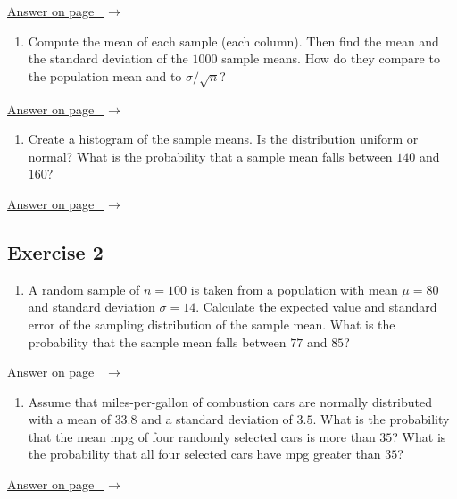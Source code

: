 \documentclass[
  11pt,
  letterpaper,
  DIV=11,
  numbers=noendperiod,
  oneside,
  open=any]{scrreprt}
\providecommand{\tightlist}{%
  \setlength{\itemsep}{0pt}\setlength{\parskip}{0pt}}\usepackage{longtable,booktabs,array}
\newcommand{\bsanswerref}[1]{%
  \par\nopagebreak\hypertarget{q-#1}{}\label{q-#1}%
  {\raggedleft\sffamily\footnotesize\hyperlink{a-#1}{\textcolor{bsaccent}{Answer on page \pageref{a-#1}\ $\rightarrow$}}\par}%
  \medskip}
\begin{document}
\bsanswerref{bsans104}

\begin{enumerate}
\def\labelenumi{\arabic{enumi}.}
\setcounter{enumi}{1}
\tightlist
\item
  Compute the mean of each sample (each column). Then find the mean and
  the standard deviation of the \(1000\) sample means. How do they
  compare to the population mean and to \(\sigma / \sqrt{n}\)?
\end{enumerate}

\bsanswerref{bsans105}

\begin{enumerate}
\def\labelenumi{\arabic{enumi}.}
\setcounter{enumi}{2}
\tightlist
\item
  Create a histogram of the sample means. Is the distribution uniform or
  normal? What is the probability that a sample mean falls between
  \(140\) and \(160\)?
\end{enumerate}

\bsanswerref{bsans106}

\subsection*{Exercise 2}\label{exercise-2-10}

\begin{enumerate}
\def\labelenumi{\arabic{enumi}.}
\tightlist
\item
  A random sample of \(n=100\) is taken from a population with mean
  \(\mu=80\) and standard deviation \(\sigma=14\). Calculate the
  expected value and standard error of the sampling distribution of the
  sample mean. What is the probability that the sample mean falls
  between \(77\) and \(85\)?
\end{enumerate}

\bsanswerref{bsans107}

\begin{enumerate}
\def\labelenumi{\arabic{enumi}.}
\setcounter{enumi}{1}
\tightlist
\item
  Assume that miles-per-gallon of combustion cars are normally
  distributed with a mean of \(33.8\) and a standard deviation of
  \(3.5\). What is the probability that the mean mpg of four randomly
  selected cars is more than \(35\)? What is the probability that all
  four selected cars have mpg greater than \(35\)?
\end{enumerate}

\bsanswerref{bsans108}
\end{document}
